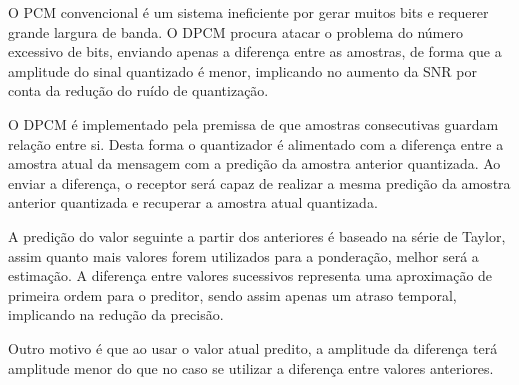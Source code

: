 \begin{subquestion}
    \item O PCM convencional é um sistema ineficiente por gerar muitos bits e requerer grande largura de banda. O DPCM procura atacar o problema do número excessivo de bits, enviando apenas a diferença entre as amostras, de forma que a amplitude do sinal quantizado é menor, implicando no aumento da SNR por conta da redução do ruído de quantização.
    \item O DPCM é implementado pela premissa de que amostras consecutivas guardam relação entre si. Desta forma o quantizador é alimentado com a diferença entre a amostra atual da mensagem com a predição da amostra anterior quantizada. Ao enviar a diferença, o receptor será capaz de realizar a mesma predição da amostra anterior quantizada e recuperar a amostra atual quantizada.
    \item A predição do valor seguinte a partir dos anteriores é baseado na série de Taylor, assim quanto mais valores forem utilizados para a ponderação, melhor será a estimação. A diferença entre valores sucessivos representa uma aproximação de primeira ordem para o preditor, sendo assim apenas um atraso temporal, implicando na redução da precisão.
    
    Outro motivo é que ao usar o valor atual predito, a amplitude da diferença terá amplitude menor do que no caso se utilizar a diferença entre valores anteriores.
\end{subquestion}